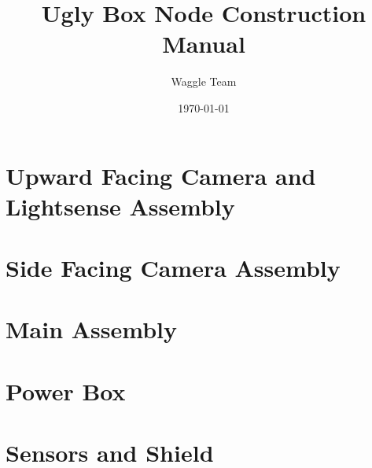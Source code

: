 \documentclass{article}
\title{Ugly Box Node Construction Manual}
\author{Waggle Team}
\date{\today}
\begin{document}
\maketitle

\newpage


\section{Upward Facing Camera and Lightsense Assembly}

\clearpage

\section{Side Facing Camera Assembly}

\clearpage

\section{Main Assembly}

\clearpage

\section{Power Box}

\clearpage

\section{Sensors and Shield}

\clearpage
\end{document}
